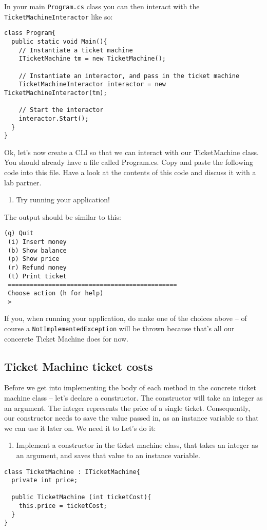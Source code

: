 \documentclass{article}
\newcounter{stepcounter}
\newenvironment{steps}{ 
  \begin{enumerate}[label=\color{red}Step \theenumi)]
    \setcounter{enumi}{\value{stepcounter}}
}{
  \setcounter{stepcounter}{\value{enumi}}
  \end{enumerate}
}
\begin{document}
In your main \texttt{Program.cs} class you can then interact with the \texttt{TicketMachineInteractor} like so:

\begin{lstlisting}
class Program{
  public static void Main(){
    // Instantiate a ticket machine
    ITicketMachine tm = new TicketMachine();

    // Instantiate an interactor, and pass in the ticket machine
    TicketMachineInteractor interactor = new TicketMachineInteractor(tm);

    // Start the interactor
    interactor.Start();
  }
}
\end{lstlisting}

Ok, let’s now create a CLI so that we can interact with our TicketMachine class. You should already have a file called Program.cs. Copy and paste the following code into this file. Have a look at the contents of this code and discuss it with a lab partner.

\begin{steps}
\item Try running your application!
\end{steps}
The output should be similar to this:

\begin{lstlisting}[style=terminal]
 (q) Quit
 (i) Insert money
 (b) Show balance
 (p) Show price
 (r) Refund money
 (t) Print ticket
 ==============================================
 Choose action (h for help)
 >
\end{lstlisting}
If you, when running your application, do make one of the choices above -- of course a \texttt{NotImplementedException} will be thrown because that's all our concerete Ticket Machine does for now.




\subsection{Ticket Machine ticket costs}
Before we get into implementing the body of each method in the concrete ticket machine class -- let's declare a constructor. The constructor will take an integer as an argument. The integer represents the price of a single ticket. Consequently, our constructor needs to save the value passed in, as an instance variable so that we can use it later on. We need it to  Let's do it:
\begin{steps}
\item Implement a constructor in the ticket machine class, that takes an integer as an argument, and saves that value to an instance variable.
\end{steps}
\begin{lstlisting}
class TicketMachine : ITicketMachine{
  private int price;

  public TicketMachine (int ticketCost){
    this.price = ticketCost;
  }
}
\end{lstlisting}
\end{document}
